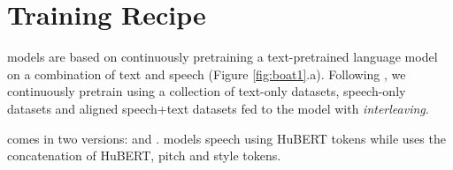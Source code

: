 \begin{table}[t]
\setlength{\tabcolsep}{2pt}
\centering\small
{}
\caption{\textbf{Statistics of training data.} P Samp. is the Sampling Proportion of each subset for a training batch. Epochs is the number of epochs seen for each subset after 100K training steps or equivalently 100B tokens. 
}
\label{tab:data}
\vspace{-1.2em}
\end{table}
\vspace{-0.5em}

\section{\spot Training Recipe}\label{sec:methods}
\vspace{-0.5em}

\spot models are based on continuously pretraining a text-pretrained language model on a combination of text and speech (Figure \ref{fig:boat1}.a).
Following \citealp{hassid2023textually}, we continuously pretrain \llamatwo \citep{touvron2023llama2} using a collection of text-only datasets, speech-only datasets and aligned speech+text datasets fed to the model with \textit{interleaving}. %

\spot comes in two versions: \base and \expressive. \spotbase models speech using HuBERT  tokens \citep{hsu2021hubert} while \spotexpressive uses the concatenation of HuBERT, pitch and style tokens. %

